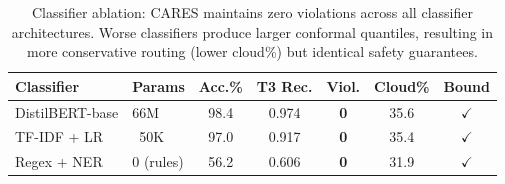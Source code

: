 \begin{table}[t]
\centering
\caption{Classifier ablation: CARES maintains zero violations across all classifier architectures. Worse classifiers produce larger conformal quantiles, resulting in more conservative routing (lower cloud\%) but identical safety guarantees.}
\label{tab:classifier_ablation}
\begin{tabular}{llccccc}
\toprule
\textbf{Classifier} & \textbf{Params} & \textbf{Acc.\%} & \textbf{T3 Rec.} & \textbf{Viol.} & \textbf{Cloud\%} & \textbf{Bound} \\
\midrule
DistilBERT-base & 66M & 98.4 & 0.974 & \textbf{0} & 35.6 & $\checkmark$ \\
TF-IDF + LR & ~50K & 97.0 & 0.917 & \textbf{0} & 35.4 & $\checkmark$ \\
Regex + NER & 0 (rules) & 56.2 & 0.606 & \textbf{0} & 31.9 & $\checkmark$ \\
\bottomrule
\end{tabular}
\end{table}